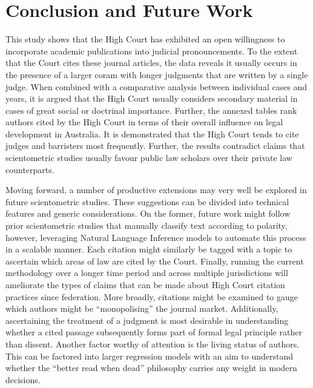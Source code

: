 \let\xn\xnote
\section{Conclusion and Future Work}

This study shows that the High Court has exhibited an open willingness to incorporate academic publications into judicial pronouncements. To the extent that the Court cites these journal articles, the data reveals it usually occurs in the presence of a larger coram with longer judgments that are written by a single judge. When combined with a comparative analysis between individual cases and years, it is argued that the High Court usually considers secondary material in cases of great social or doctrinal importance. Further, the annexed tables rank authors cited by the High Court in terms of their overall influence on legal development in Australia. It is demonstrated that the High Court tends to cite judges and barristers most frequently. Further, the results contradict claims that scientometric studies usually favour public law scholars over their private law counterparts.

Moving forward, a number of productive extensions may very well be explored in future scientometric studies. These suggestions can be divided into technical features and generic considerations. On the former, future work might follow prior scientometric studies that manually classify text according to polarity, however, leveraging Natural Language Inference models to automate this process in a scalable manner.\xn{7-1} Each citation might similarly be tagged with a topic to ascertain which areas of law are cited by the Court.\xn{7-2} Finally, running the current methodology over a longer time period and across multiple jurisdictions will ameliorate the types of claims that can be made about High Court citation practices since federation. More broadly, citations might be examined to gauge which authors might be ``monopolising'' the journal market.\xn{7-3} Additionally, ascertaining the treatment of a judgment is most desirable in understanding whether a cited passage subsequently forms part of formal legal principle rather than dissent.\xn{7-4} Another factor worthy of attention is the living status of authors. This can be factored into larger regression models with an aim to understand whether the ``better read when dead'' philosophy carries any weight in modern decisions.



